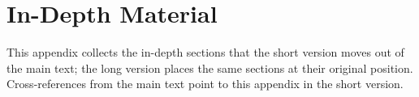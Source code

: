 \chapter{In-Depth Material}\label{app:vertiefungen}
This appendix collects the in-depth sections that the short version moves out of the main text; the long version places the same sections at their original position. Cross-references from the main text point to this appendix in the short version.
